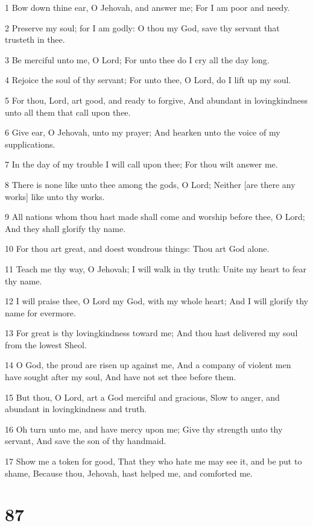 \par 1 Bow down thine ear, O Jehovah, and answer me; For I am poor and needy.
\par 2 Preserve my soul; for I am godly: O thou my God, save thy servant that trusteth in thee.
\par 3 Be merciful unto me, O Lord; For unto thee do I cry all the day long.
\par 4 Rejoice the soul of thy servant; For unto thee, O Lord, do I lift up my soul.
\par 5 For thou, Lord, art good, and ready to forgive, And abundant in lovingkindness unto all them that call upon thee.
\par 6 Give ear, O Jehovah, unto my prayer; And hearken unto the voice of my supplications.
\par 7 In the day of my trouble I will call upon thee; For thou wilt answer me.
\par 8 There is none like unto thee among the gods, O Lord; Neither [are there any works] like unto thy works.
\par 9 All nations whom thou hast made shall come and worship before thee, O Lord; And they shall glorify thy name.
\par 10 For thou art great, and doest wondrous things: Thou art God alone.
\par 11 Teach me thy way, O Jehovah; I will walk in thy truth: Unite my heart to fear thy name.
\par 12 I will praise thee, O Lord my God, with my whole heart; And I will glorify thy name for evermore.
\par 13 For great is thy lovingkindness toward me; And thou hast delivered my soul from the lowest Sheol.
\par 14 O God, the proud are risen up against me, And a company of violent men have sought after my soul, And have not set thee before them.
\par 15 But thou, O Lord, art a God merciful and gracious, Slow to anger, and abundant in lovingkindness and truth.
\par 16 Oh turn unto me, and have mercy upon me; Give thy strength unto thy servant, And save the son of thy handmaid.
\par 17 Show me a token for good, That they who hate me may see it, and be put to shame, Because thou, Jehovah, hast helped me, and comforted me.

\chapter{87}

